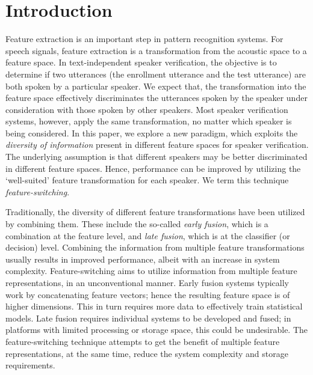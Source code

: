 \documentclass[preprint,12pt,5p]{elsarticle}
\begin{document}
\section{Introduction}
\label{sec:intro}
Feature extraction is an important step in pattern recognition systems. For
speech signals, feature extraction is a transformation from the acoustic space
to a feature space. In text-independent speaker verification, the objective is
to determine if two utterances (the enrollment utterance and the test utterance) are
both spoken by a particular speaker. We expect that, the transformation into the
feature space effectively discriminates the utterances spoken by the speaker
under consideration with those spoken by other speakers. Most speaker
verification systems, however, apply the same transformation, no matter which
speaker is being considered. In this paper, we explore a new paradigm, which
exploits the \emph{diversity of information} present in different feature spaces
for speaker verification. The underlying assumption is that different speakers
may be better discriminated in different feature spaces. Hence, performance can
be improved by utilizing the `well-suited' feature transformation for
each speaker. We term this technique \emph{feature-switching}. 

Traditionally, the diversity of different feature transformations have been
utilized by combining them. These include the so-called \emph{early fusion},
which is a combination at the feature level, and \emph{late fusion}, which is at
the classifier (or decision) level. Combining the information from multiple
feature transformations usually results in improved performance, albeit
with an increase in system complexity. Feature-switching aims to utilize
information from multiple feature representations, in an unconventional manner. 
Early fusion systems typically work by concatenating feature vectors;
hence the resulting feature space is of higher dimensions. This in turn requires
more data to effectively train statistical models. Late fusion requires
individual systems to be developed and fused; in platforms with limited
processing or storage space, this could be undesirable. The feature-switching
technique attempts to get the benefit of multiple feature representations, at the
same time, reduce the system complexity and storage requirements.
\end{document}
